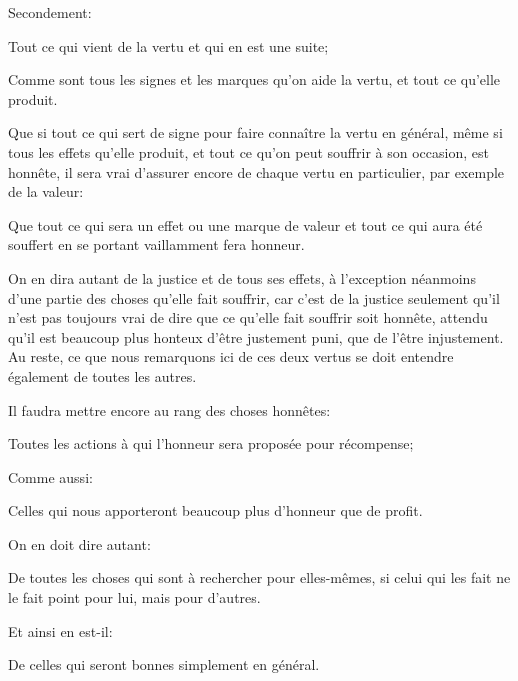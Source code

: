 Secondement:

\begin{lieu}
	Tout ce qui vient de la vertu et qui en est une suite;
\end{lieu}

Comme sont tous les signes et les marques qu'on aide la vertu, et tout ce qu'elle produit.

\bigbreak

Que si tout ce qui sert de signe pour faire connaître la vertu en général, même si tous les effets qu'elle produit,
et tout ce qu'on peut souffrir à son occasion, est honnête, il sera vrai d'assurer encore de chaque vertu en particulier,
par exemple de la valeur:

\begin{lieu}
	Que tout ce qui sera un effet ou une marque de valeur et tout ce qui aura été souffert en se portant vaillamment
	fera honneur.
\end{lieu}

On en dira autant de la justice et de tous ses effets, à l'exception néanmoins d'une partie des choses qu'elle fait souffrir,
car c'est de la justice seulement qu'il n'est pas toujours vrai de dire que ce qu'elle fait souffrir soit honnête, attendu
qu'il est beaucoup plus honteux d'être justement puni, que de l'être injustement. Au reste, ce que nous remarquons ici de ces
deux vertus se doit entendre également de toutes les autres.

\bigbreak

Il faudra mettre encore au rang des choses honnêtes:

\begin{lieu}
	Toutes les actions à qui l'honneur sera proposée pour récompense;
\end{lieu}

Comme aussi:

\begin{lieu}
	Celles qui nous apporteront beaucoup plus d'honneur que de profit.
\end{lieu}

On en doit dire autant:

\begin{lieu}
	De toutes les choses qui sont à rechercher pour elles-mêmes, si celui qui les fait ne le fait point pour
	lui, mais pour d'autres.
\end{lieu}

Et ainsi en est-il:

\begin{lieu}
	De celles qui seront bonnes simplement en général.
\end{lieu}

